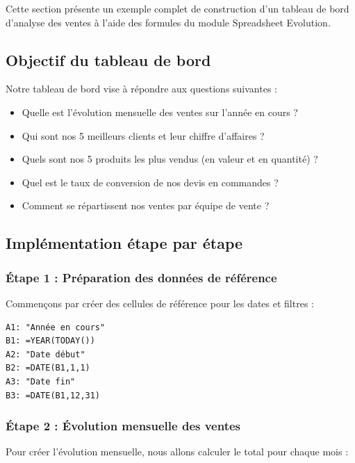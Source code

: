 \documentclass[12pt, a4paper]{article}
\begin{document}
Cette section présente un exemple complet de construction d'un tableau de bord d'analyse des ventes à l'aide des formules du module Spreadsheet Evolution.

\subsection{Objectif du tableau de bord}

Notre tableau de bord vise à répondre aux questions suivantes :
\begin{itemize}
    \item Quelle est l'évolution mensuelle des ventes sur l'année en cours ?
    \item Qui sont nos 5 meilleurs clients et leur chiffre d'affaires ?
    \item Quels sont nos 5 produits les plus vendus (en valeur et en quantité) ?
    \item Quel est le taux de conversion de nos devis en commandes ?
    \item Comment se répartissent nos ventes par équipe de vente ?
\end{itemize}


\subsection{Implémentation étape par étape}

\subsubsection{Étape 1 : Préparation des données de référence}

Commençons par créer des cellules de référence pour les dates et filtres :

\begin{lstlisting}
A1: "Année en cours"
B1: =YEAR(TODAY())
A2: "Date début"
B2: =DATE(B1,1,1)
A3: "Date fin"
B3: =DATE(B1,12,31)
\end{lstlisting}

\subsubsection{Étape 2 : Évolution mensuelle des ventes}

Pour créer l'évolution mensuelle, nous allons calculer le total pour chaque mois :
\end{document}
